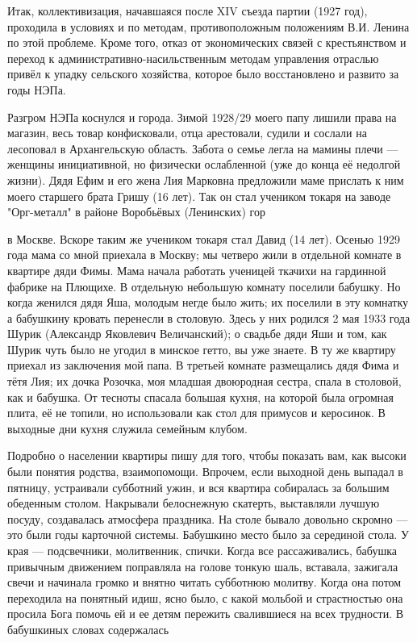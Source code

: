 \label{146-2}
Итак, коллективизация, начавшаяся после XIV съезда партии (1927 год), проходила в условиях и по методам, противоположным положениям В.И. Ленина по этой проблеме. Кроме того, отказ от экономических связей с крестьянством и переход к административно-насильственным методам управления отраслью привёл к упадку сельского хозяйства, которое было восстановлено и развито за годы НЭПа.

\label{147-1}
Разгром НЭПа коснулся и города. Зимой 1928/29 моего папу лишили права на магазин, весь товар конфисковали, отца арестовали, судили и сослали на лесоповал в Архангельскую область. Забота о семье легла на мамины плечи — женщины инициативной, но физически ослабленной (уже до конца её недолгой жизни). Дядя Ефим и его жена Лия Марковна предложили маме прислать к ним моего старшего брата Гришу (16 лет). Так он стал учеником токаря на заводе "Орг-металл" в районе Воробьёвых (Ленинских) гор 

\label{148-1}
в Москве. Вскоре таким же учеником токаря стал Давид (14 лет). Осенью 1929 года мама со мной приехала в Москву; мы четверо жили в отдельной комнате в квартире дяди Фимы. Мама начала работать ученицей ткачихи на гардинной фабрике на Плющихе. В отдельную небольшую комнату поселили бабушку. Но когда женился дядя Яша, молодым негде было жить; их поселили в эту комнатку а бабушкину кровать перенесли в столовую. Здесь у них родился 2 мая 1933 года Шурик (Александр Яковлевич Величанский); о свадьбе дяди Яши и том, как Шурик чуть было не угодил в минское гетто, вы уже знаете. В ту же квартиру приехал из заключения мой папа. В третьей комнате размещались дядя Фима и тётя Лия; их дочка Розочка, моя младшая двоюродная сестра, спала в столовой, как и бабушка. От тесноты спасала большая кухня, на которой была огромная плита, её не топили, но использовали как стол для примусов и керосинок. В выходные дни кухня служила семейным клубом.

\label{149-1}
Подробно о населении квартиры пишу для того, чтобы показать вам, как высоки были понятия родства, взаимопомощи.
Впрочем, если выходной день выпадал в пятницу, устраивали субботний ужин, и вся квартира собиралась за большим обеденным столом. Накрывали белоснежную скатерть, выставляли лучшую посуду, создавалась атмосфера праздника. На столе бывало довольно скромно — это были годы карточной системы. Бабушкино место было за серединой стола. У края — подсвечники, молитвенник, спички. Когда все рассаживались, бабушка привычным движением поправляла на голове тонкую шаль, вставала, зажигала свечи и начинала громко и внятно читать субботнюю молитву. Когда она потом переходила на понятный идиш, ясно было, с какой мольбой и страстностью она просила Бога помочь ей и ее детям пережить свалившиеся на всех трудности. В бабушкиных словах содержалась
 
